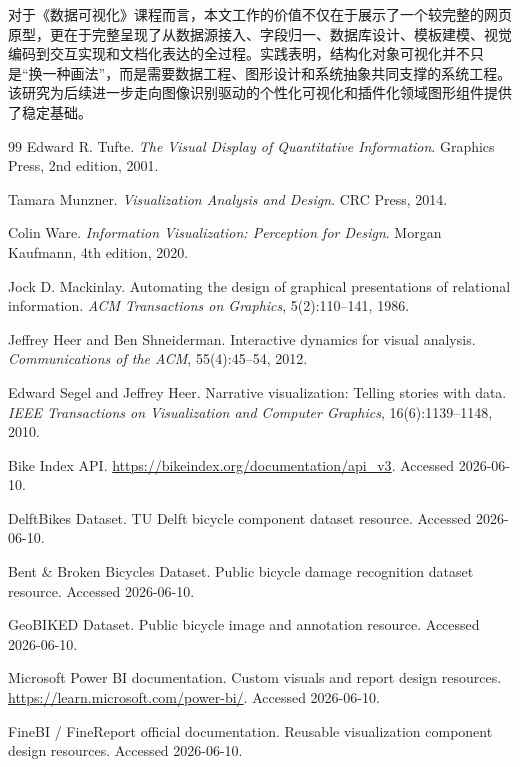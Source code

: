 \documentclass[12pt,hyperref,a4paper,UTF8]{ctexart}
\begin{document}
对于《数据可视化》课程而言，本文工作的价值不仅在于展示了一个较完整的网页原型，更在于完整呈现了从数据源接入、字段归一、数据库设计、模板建模、视觉编码到交互实现和文档化表达的全过程。实践表明，结构化对象可视化并不只是“换一种画法”，而是需要数据工程、图形设计和系统抽象共同支撑的系统工程。该研究为后续进一步走向图像识别驱动的个性化可视化和插件化领域图形组件提供了稳定基础。

\begin{thebibliography}{99}
Edward R. Tufte. \textit{The Visual Display of Quantitative Information}. Graphics Press, 2nd edition, 2001.

Tamara Munzner. \textit{Visualization Analysis and Design}. CRC Press, 2014.

Colin Ware. \textit{Information Visualization: Perception for Design}. Morgan Kaufmann, 4th edition, 2020.

Jock D. Mackinlay. Automating the design of graphical presentations of relational information. \textit{ACM Transactions on Graphics}, 5(2):110--141, 1986.

Jeffrey Heer and Ben Shneiderman. Interactive dynamics for visual analysis. \textit{Communications of the ACM}, 55(4):45--54, 2012.

Edward Segel and Jeffrey Heer. Narrative visualization: Telling stories with data. \textit{IEEE Transactions on Visualization and Computer Graphics}, 16(6):1139--1148, 2010.

Bike Index API. \url{https://bikeindex.org/documentation/api_v3}. Accessed 2026-06-10.

DelftBikes Dataset. TU Delft bicycle component dataset resource. Accessed 2026-06-10.

Bent \& Broken Bicycles Dataset. Public bicycle damage recognition dataset resource. Accessed 2026-06-10.

GeoBIKED Dataset. Public bicycle image and annotation resource. Accessed 2026-06-10.

Microsoft Power BI documentation. Custom visuals and report design resources. \url{https://learn.microsoft.com/power-bi/}. Accessed 2026-06-10.

FineBI / FineReport official documentation. Reusable visualization component design resources. Accessed 2026-06-10.
\end{thebibliography}
\end{document}
